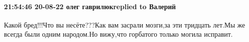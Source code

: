  
 
 
 
 

\paragraph{21:54:46 20-08-22 олег гаврилюкreplied to Валерий}

Какой бред!!!Что вы несёте???Как вам засрали мозги,за эти тридцать лет.Мы же
всегда были одним народом.Но вижу,что горбатого только могила исправит.

